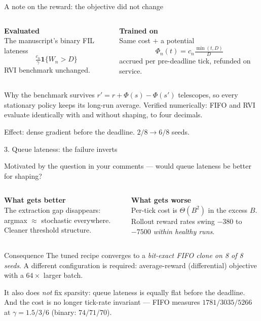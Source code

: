 \documentclass[11pt,aspectratio=169]{beamer}
\begin{document}
\begin{frame}{A note on the reward: the objective did not change}

\begin{columns}[T]
\textbf{Evaluated} \\[2pt]
The manuscript's binary FIL lateness
\[ \tfrac{c_n}{\gamma}\mathbf{1}\{W_n > D\} \]
RVI benchmark unchanged.

\textbf{Trained on} \\[2pt]
Same cost $+$ a potential
\[ \Phi_n(t) = c_n \tfrac{\min(t,D)}{D} \]
accrued per pre-deadline tick, refunded on service.
\end{columns}

\vfill
\begin{block}{Why the benchmark survives}
$r' = r + \Phi(s) - \Phi(s')$ telescopes, so every stationary policy keeps its
long-run average.  Verified numerically: FIFO and RVI evaluate identically with
and without shaping, to four decimals.
\end{block}

\vfill
Effect: dense gradient before the deadline.  $2/8 \to 6/8$ seeds.

\end{frame}

\begin{frame}{3. Queue lateness: the failure inverts}

Motivated by the question in your comments --- would queue lateness be better for
shaping?

\vfill
\begin{columns}[T]
\textbf{What gets better} \\[2pt]
The extraction gap disappears: argmax $\approx$ stochastic everywhere.  Cleaner
threshold structure.

\textbf{What gets worse} \\[2pt]
Per-tick cost is $\Theta(B^2)$ in the excess $B$.  Rollout reward rates swing
$-380$ to $-7500$ \emph{within healthy runs}.
\end{columns}

\vfill
\begin{block}{Consequence}
The tuned recipe converges to a \emph{bit-exact FIFO clone on 8 of 8 seeds}.
A different configuration is required: average-reward (differential) objective
with a $64\times$ larger batch.
\end{block}

\vfill
\small
It also does \emph{not} fix sparsity: queue lateness is equally flat before the
deadline.  And the cost is no longer tick-rate invariant --- FIFO measures
$1781 / 3035 / 5266$ at $\gamma = 1.5/3/6$ (binary: $74/71/70$).

\end{frame}
\end{document}

